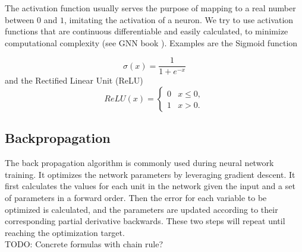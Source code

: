 The activation function usually serves the purpose of mapping to a real number between $0$ and $1$, imitating the activation of a neuron. We try to use activation functions that are continuous differentiable and easily calculated, to minimize computational complexity (see GNN book \cite{Liu2020}). Examples are the Sigmoid function

\begin{equation}
    \sigma (x)= \frac{1}{1+e^{-x}}
\end{equation}
and the Rectified Linear Unit (ReLU)
\begin{equation}
    ReLU(x)=\begin{cases}
        0 & x \leq 0, \\
        1 & x > 0.
    \end{cases}
\end{equation}



\subsection{Backpropagation}
The back propagation algorithm is commonly used during neural network training. It optimizes the network parameters by leveraging gradient descent. It first calculates the values for each unit in the network given the input and a set of parameters in a forward order. Then the error for each variable to be optimized is calculated, and the parameters are updated according to their corresponding partial derivative backwards. These two steps will repeat until reaching the optimization target. \\
TODO: Concrete formulas with chain rule?

